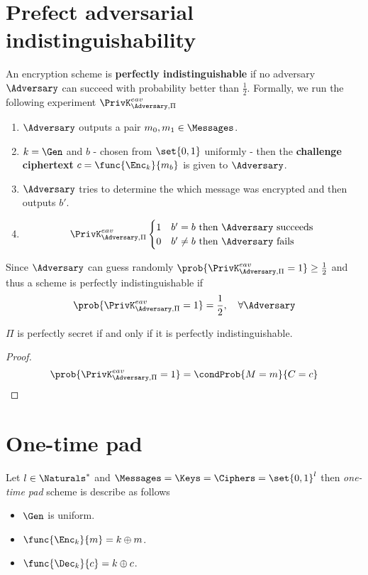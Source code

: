  \section{Prefect adversarial indistinguishability}
 An encryption scheme is \textbf{perfectly indistinguishable} if no adversary \(\Adversary\) can succeed with probability better than \(\frac{1}{2}\). Formally, we run the following experiment \(\PrivK_{\Adversary, \Pi}^{eav}\)
 \begin{enumerate}
     \item \(\Adversary\) outputs a pair \(m_0,m_1 \in \Messages\).
     \item \(k = \Gen\) and \(b\) - chosen from \(\set{0,1}\) uniformly - then the \textbf{challenge ciphertext} \(c = \func{\Enc_k}{m_b}\) is given to \(\Adversary\).
     \item \(\Adversary\) tries to determine the which message was encrypted and then outputs \(b'\).
     \item 
     \begin{equation*}
        \PrivK_{\Adversary, \Pi}^{eav}
         \begin{cases}
            1 & b' = b \ \text{then}\  \Adversary \ \text{succeeds}\\
            0 & b' \neq b \  \text{then}\  \Adversary \ \text{fails}
         \end{cases}
     \end{equation*}
 \end{enumerate}

 Since \(\Adversary\) can guess randomly \(\prob{\PrivK_{\Adversary, \Pi}^{eav} = 1} \geq \frac{1}{2}\) and thus a scheme is perfectly indistinguishable if 
 \begin{equation*}
    \prob{\PrivK_{\Adversary, \Pi}^{eav} = 1}  = \frac{1}{2}, \quad \forall \Adversary
 \end{equation*}

 \begin{proposition}
     \(\Pi\) is perfectly secret if and only if it is perfectly indistinguishable.
 \end{proposition}

 \begin{proof}
    \begin{equation*}
    \prob{\PrivK_{\Adversary, \Pi}^{eav} = 1}  = \condProb{M = m }{C = c}
    \end{equation*}
 \end{proof}

 \section{One-time pad}
Let \(l \in \Naturals^{\ast}\) and \(\Messages = \Keys = \Ciphers = \set{0,1}^{l}\) then \textit{one-time pad} scheme is describe as follows 
\begin{itemize}
    \item \(\Gen\) is uniform.
    \item \(\func{\Enc_k}{m} = k \oplus m\).
    \item \(\func{\Dec_k}{c} = k \oplus c\).
\end{itemize}

